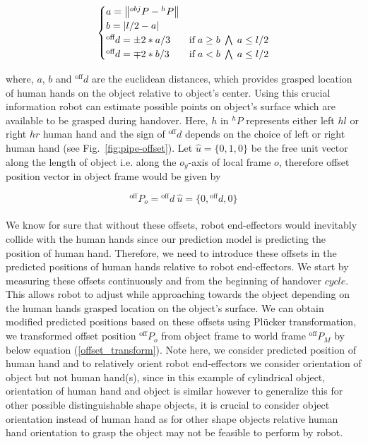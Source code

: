 \documentclass[a4paper, 12pt, oneside]{Thesis}  %
\begin{document}
\begin{equation}\label{hand rel pos on obj}
\centering
\begin{cases}
	a = \norm{{}^{obj}{P} - {}^{h}{P}} & \text{}  \\
	
	b = \abs{l/2 - a}  & \text{} \\
	
	{}^\text{off}{d} = \pm 2*a/3 &  \text{if} \; a \geq b \; \bigwedge \; a\leq l/2\\

	{}^\text{off}{d} = \mp 2*b/3 &  \text{if} \; a < b \; \bigwedge \; a\leq l/2\\
\end{cases}
\end{equation}

where, $a$, $b$ and ${}^\text{off}{d}$ are the euclidean distances, which provides grasped location of human hands on the object relative to object's center. Using this crucial information robot can estimate possible points on object's surface which are available to be grasped during handover. Here, $h$ in ${}^{h}{P}$ represents either left $hl$ or right $hr$ human hand and the sign of ${}^\text{off}{d}$ depends on the choice of left or right human hand (see Fig.~\ref{fig:pipe-offset}). Let $\hat{u} = \{0, 1, 0\}$ be the free unit vector along the length of object i.e. along the $o_y$-axis of local frame $o$, therefore offset position vector in object frame would be given by

\begin{equation}
	{}^\text{off}{P}_{o} = {}^\text{off}{d} \: \hat{u}  =  \{0, {}^\text{off}{d}, 0\}
\end{equation}

\paragraph*{}
We know for sure that without these offsets, robot end-effectors would inevitably collide with the human hands since our prediction model is predicting the position of human hand. Therefore, we need to introduce these offsets in the predicted positions of human hands relative to robot end-effectors. We start by measuring these offsets continuously and from the beginning of handover $\textit{cycle}$. This allows robot to adjust while approaching towards the object depending on the human hands grasped location on the object's surface. We can obtain modified predicted positions based on these offsets using Pl\"ucker transformation, we transformed offset position ${}^\text{off}{P}_{o}$ from object frame to world frame ${}^\text{off}{P}_{M}$ by below equation (\ref{offset_transform}). Note here, we consider predicted position of human hand and to relatively orient robot end-effectors we consider orientation of object but not human hand(s), since in this example of cylindrical object, orientation of human hand and object is similar however to generalize this for other possible distinguishable shape objects, it is crucial to consider object orientation instead of human hand as for other shape objects relative human hand orientation to grasp the object may not be feasible to perform by robot. 
\end{document}
